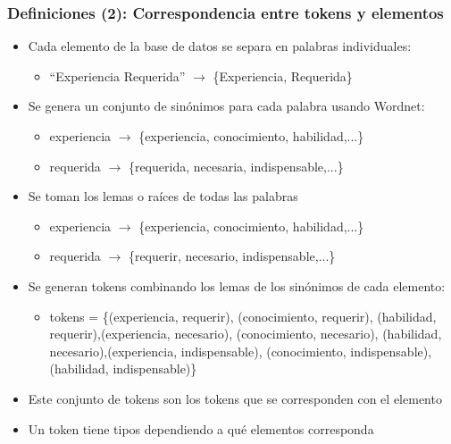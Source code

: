 \documentclass{beamer}
\begin{document}
\fontsize{9.5pt}{7.2}\selectfont
\begin{frame}
  \frametitle{Definiciones (2): Correspondencia entre tokens y elementos}
  \begin{itemize}
    \item Cada elemento de la base de datos se separa en palabras individuales:
    \begin{itemize}\fontsize{9.5pt}{7.2}\selectfont
      \item “Experiencia Requerida” $\rightarrow$ \{Experiencia, Requerida\}
    \end{itemize}
    \item Se genera un conjunto de sinónimos para cada palabra usando Wordnet:
    \begin{itemize}\fontsize{9.5pt}{7.2}\selectfont
      \item experiencia $\rightarrow$ \{experiencia, conocimiento, habilidad,...\}
      \item requerida $\rightarrow$ \{requerida, necesaria, indispensable,...\}
    \end{itemize}
    \item Se toman los lemas o raíces de todas las palabras
      \begin{itemize}\fontsize{9.5pt}{7.2}\selectfont
        \item experiencia $\rightarrow$ \{experiencia, conocimiento, habilidad,...\}
        \item requerida $\rightarrow$ \{requerir, necesario, indispensable,...\}
    \end{itemize}
    \item Se generan tokens combinando los lemas de los sinónimos de cada elemento:
    \begin{itemize}\fontsize{9.5pt}{7.2}\selectfont
        \item tokens = \{(experiencia, requerir), (conocimiento, requerir), (habilidad, requerir),(experiencia, necesario), (conocimiento, necesario), (habilidad, necesario),(experiencia, indispensable), (conocimiento, indispensable), (habilidad, indispensable)\}
    \end{itemize}
    \item Este conjunto de tokens son los tokens que se corresponden con el elemento
    \item Un token tiene tipos dependiendo a qué elementos corresponda
  \end{itemize}
\end{frame}
\end{document}
